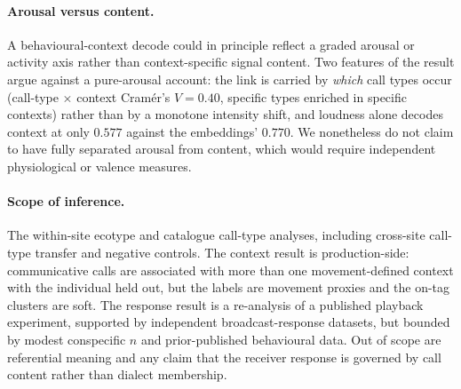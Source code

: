 \documentclass[11pt]{article}
\begin{document}
\paragraph{Arousal versus content.} A behavioural-context decode could in principle
reflect a graded arousal or activity axis rather than context-specific signal content. Two
features of the result argue against a pure-arousal account: the link is carried by
\emph{which} call types occur (call-type $\times$ context Cram\'er's $V=0.40$, specific
types enriched in specific contexts) rather than by a monotone intensity shift, and
loudness alone decodes context at only $0.577$ against the embeddings' $0.770$. We
nonetheless do not claim to have fully separated arousal from content, which would require
independent physiological or valence measures.

\paragraph{Scope of inference.} The within-site ecotype and
catalogue call-type analyses, including cross-site call-type transfer and negative controls.
The context result is production-side: communicative calls are associated with more than one
movement-defined context with the individual held out, but the labels are movement proxies and
the on-tag clusters are soft. The response result is a re-analysis of a published playback
experiment, supported by independent broadcast-response datasets, but bounded by modest
conspecific $n$ and prior-published behavioural data. Out of scope are referential meaning and
any claim that the receiver response is governed by call content rather than dialect membership.
\end{document}
